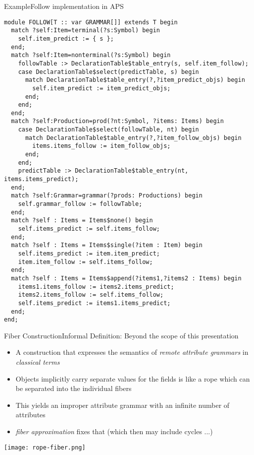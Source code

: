 \begin{frame}[fragile=singleslide]{Example}{Follow implementation in APS}

\begin{Verbatim}[fontsize=\fontsize{2.5}{4}\selectfont]
module FOLLOW[T :: var GRAMMAR[]] extends T begin
  match ?self:Item=terminal(?s:Symbol) begin
    self.item_predict := { s };
  end;
  match ?self:Item=nonterminal(?s:Symbol) begin
    followTable :> DeclarationTable$table_entry(s, self.item_follow);
    case DeclarationTable$select(predictTable, s) begin
      match DeclarationTable$table_entry(?,?item_predict_objs) begin
        self.item_predict := item_predict_objs;
      end;
    end;
  end;
  match ?self:Production=prod(?nt:Symbol, ?items: Items) begin
    case DeclarationTable$select(followTable, nt) begin
      match DeclarationTable$table_entry(?,?item_follow_objs) begin
        items.items_follow := item_follow_objs;
      end;
    end;
    predictTable :> DeclarationTable$table_entry(nt, items.items_predict);
  end;
  match ?self:Grammar=grammar(?prods: Productions) begin
    self.grammar_follow := followTable;
  end;
  match ?self : Items = Items$none() begin
    self.items_predict := self.items_follow;
  end;
  match ?self : Items = Items$single(?item : Item) begin
    self.items_predict := item.item_predict;
    item.item_follow := self.items_follow;
  end;
  match ?self : Items = Items$append(?items1,?items2 : Items) begin
    items1.items_follow := items2.items_predict;
    items2.items_follow := self.items_follow;
    self.items_predict := items1.items_predict;
  end;
end;
\end{Verbatim}

\end{frame}



\begin{frame}{Fiber Construction}{Informal Definition: Beyond the scope of this presentation}

\small
\begin{itemize}
    \item A construction that expresses the semantics of \emph{remote attribute grammars} in \emph{classical terms}
    \item Objects implicitly carry separate values for the fields is like a \alert{rope} which can be separated into the individual fibers
    \item This yields an improper attribute grammar with an infinite number of attributes
    \item \emph{fiber approximation} fixes that (which then may include cycles ...)
\end{itemize}

\begin{center}
\texttt{[image: rope-fiber.png]}
\end{center}
    
\end{frame}

